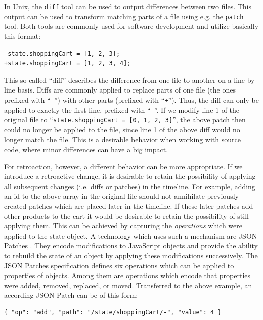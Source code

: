 In Unix, the \texttt{diff} tool can be used to output differences between two 
files. This output can be used to transform matching parts of a file using e.g. 
the \texttt{patch} tool. Both tools are commonly used for software development 
and utilize basically this format:

\begin{lstlisting}[style=stylec]
-state.shoppingCart = [1, 2, 3];
+state.shoppingCart = [1, 2, 3, 4];
\end{lstlisting}

This so called ``diff'' describes the difference from one file to another on a 
line-by-line basis. Diffs are commonly applied to replace parts of one file 
(the ones prefixed with ``\texttt{-}'') with other parts (prefixed with 
``\texttt{+}''). 
%
Thus, the diff can only be applied to exactly the first line, prefixed with 
``\texttt{-}''. If we modify line 1 of the original file to 
``\texttt{state.shoppingCart = [0, 1, 2, 3]}'', the above patch then could no 
longer be applied to the file, since line 1 of the above diff would no longer 
match the file. This is a desirable behavior when working with source code, 
where minor differences can have a big impact.

For retroaction, however, a different behavior can be more appropriate. If we 
introduce a retroactive change, it is desirable to retain the possibility of 
applying all subsequent changes (i.e.  diffs or patches) in the timeline.
For example, adding an id to the above  array in the original 
file should not annihilate previously created patches which are placed later in 
the timeline. If these later patches add other products to the cart it would be 
desirable to retain the possibility of still applying them.
%
This can be achieved by capturing the \emph{operations} which were applied to 
the state object. A technology which uses such a mechanism are JSON Patches 
\cite{RFC6902}. They encode modifications to JavaScript objects and provide 
the ability to rebuild the state of an object by applying these modifications 
successively. 
%
The JSON Patches specification defines six operations which can be applied to 
properties of objects. Among them are operations which encode that properties 
were added, removed, replaced, or moved. 
Transferred to the above example, an according JSON Patch can be of this form:

\begin{lstlisting}[style=styled]
{ "op": "add", "path": "/state/shoppingCart/-", "value": 4 }
\end{lstlisting}

